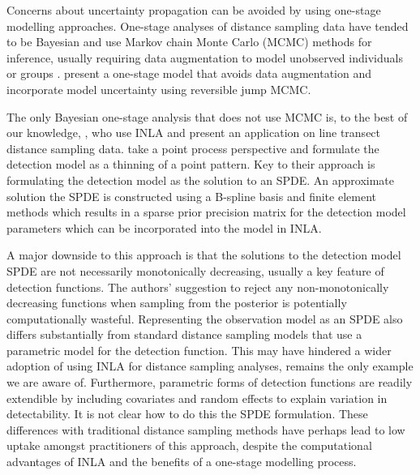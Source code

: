 \documentclass{stylefile16/statsoc}
\begin{document}
Concerns about uncertainty propagation can be avoided by using one-stage modelling approaches.  One-stage analyses of distance sampling data have tended to be Bayesian and use Markov chain Monte Carlo (MCMC) methods for inference, usually requiring data augmentation to model unobserved individuals or groups
\citep{royle_HierarchicalModelSpatial_2008, schmidt_using_2012}.  \citet{oedekoven_bayesian_2014} present a one-stage model that avoids data augmentation and incorporate model uncertainty using reversible jump MCMC.

The only Bayesian one-stage analysis that does not use MCMC is, to the best of our knowledge, \citet{yuan_point_2017}, who use INLA \citep{rue_approximate_2009} and present an application on line transect distance sampling data.  \citet{yuan_point_2017} take a point process perspective and formulate the detection model as a thinning of a point pattern.  Key to their approach is formulating the detection model as the solution to an SPDE.  An approximate solution the SPDE is constructed using a B-spline basis and finite element methods which results in a sparse prior precision matrix for the detection model parameters which can be incorporated into the model in INLA.  

A major downside to this approach is that the solutions to the detection model SPDE are not necessarily monotonically decreasing, usually a key feature of detection functions.  The authors' suggestion to reject any non-monotonically decreasing functions when sampling from the posterior is potentially computationally wasteful. Representing the observation model as an SPDE also differs substantially from standard distance sampling models that use a parametric model for the detection function.  This may have hindered a wider adoption of using INLA for distance sampling analyses, \cite{yuan_point_2017} remains the only example we are aware of.  Furthermore, parametric forms of detection functions are readily extendible by including covariates and random effects to explain variation in detectability.  It is not clear how to do this the SPDE formulation.  These differences with traditional distance sampling methods have perhaps lead to low uptake amongst practitioners of this approach, despite the computational advantages of INLA and the benefits of a one-stage modelling process.  
\end{document}
